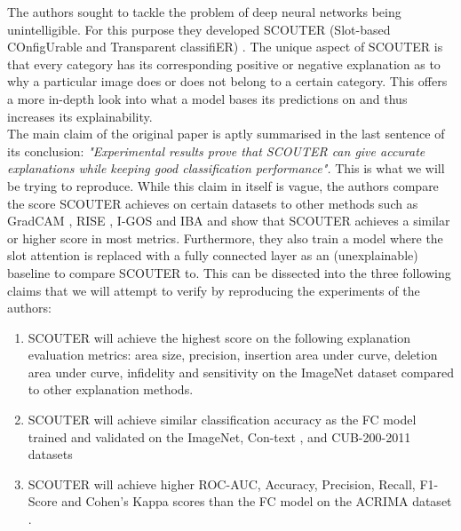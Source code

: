The authors sought to tackle the problem of deep neural networks being unintelligible. For this purpose they developed SCOUTER (Slot-based COnfigUrable and Transparent classifiER) \cite{scouter}. The unique aspect of SCOUTER is that every category has its corresponding positive or negative explanation as to why a particular image does or does not belong to a certain category. This offers a more in-depth look into what a model bases its predictions on and thus increases its explainability.
\\
The main claim of the original paper is aptly summarised in the last sentence of its conclusion: \textit{"Experimental results prove that SCOUTER can give accurate explanations while keeping good classification performance".} This is what we will be trying to reproduce. While this claim in itself is vague, the authors compare the score SCOUTER achieves on certain datasets to other methods such as GradCAM \cite{gradcam}, RISE \cite{rise}, I-GOS \cite{igos} and IBA \cite{IBA} and show that SCOUTER achieves a similar or higher score in most metrics. Furthermore, they also train a model where the slot attention is replaced with a fully connected layer as an (unexplainable) baseline to compare SCOUTER to. This can be dissected into the three following claims that we will attempt to verify by reproducing the experiments of the authors:
\begin{enumerate}
    \item SCOUTER will achieve the highest score on the following explanation evaluation metrics: area size, precision, insertion area under curve, deletion area under curve, infidelity and sensitivity on the ImageNet dataset \cite{imagenet} compared to other explanation methods.
    \item SCOUTER will achieve similar classification accuracy as the FC model trained and validated on the ImageNet, Con-text \cite{con-text}, and CUB-200-2011 \cite{cub-200} datasets
    \item SCOUTER will achieve higher ROC-AUC, Accuracy, Precision, Recall, F1-Score and Cohen's Kappa scores than the FC model on the ACRIMA dataset \cite{acrima}.
\end{enumerate}



